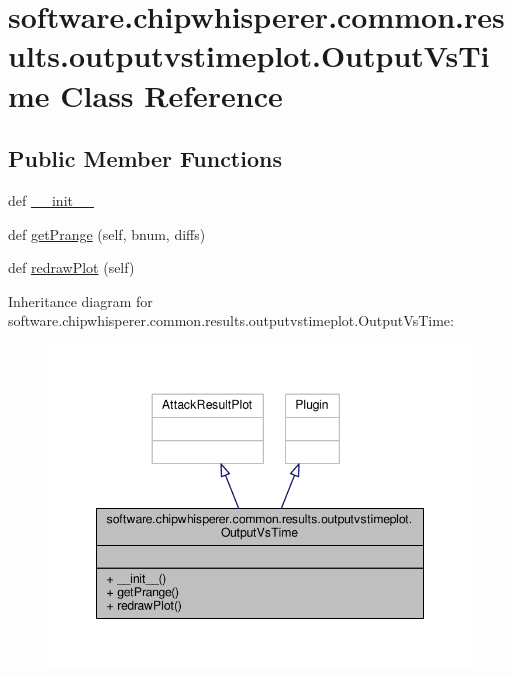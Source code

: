 \hypertarget{classsoftware_1_1chipwhisperer_1_1common_1_1results_1_1outputvstimeplot_1_1OutputVsTime}{}\section{software.\+chipwhisperer.\+common.\+results.\+outputvstimeplot.\+Output\+Vs\+Time Class Reference}
\label{classsoftware_1_1chipwhisperer_1_1common_1_1results_1_1outputvstimeplot_1_1OutputVsTime}
\subsection*{Public Member Functions}
\begin{DoxyCompactItemize}
\item 
def \hyperlink{classsoftware_1_1chipwhisperer_1_1common_1_1results_1_1outputvstimeplot_1_1OutputVsTime_ae2d0798f0ed539ee3b4165e02f9f56f2}{\+\_\+\+\_\+init\+\_\+\+\_\+}
\item 
def \hyperlink{classsoftware_1_1chipwhisperer_1_1common_1_1results_1_1outputvstimeplot_1_1OutputVsTime_a6d4112ef06f838b7fc31694febaae29a}{get\+Prange} (self, bnum, diffs)
\item 
def \hyperlink{classsoftware_1_1chipwhisperer_1_1common_1_1results_1_1outputvstimeplot_1_1OutputVsTime_a3092d300cb50918e38b826435898b961}{redraw\+Plot} (self)
\end{DoxyCompactItemize}


Inheritance diagram for software.\+chipwhisperer.\+common.\+results.\+outputvstimeplot.\+Output\+Vs\+Time\+:\nopagebreak
\begin{figure}[H]
\begin{center}
\leavevmode
\includegraphics[width=348pt]{d0/d38/classsoftware_1_1chipwhisperer_1_1common_1_1results_1_1outputvstimeplot_1_1OutputVsTime__inherit__graph}
\end{center}
\end{figure}


